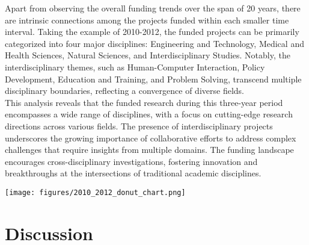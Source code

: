 \documentclass[12pt,twoside]{report}
\begin{document}
Apart from observing the overall funding trends over the span of 20 years, there are intrinsic connections among the projects funded within each smaller time interval. Taking the example of 2010-2012, the funded projects can be primarily categorized into four major disciplines: Engineering and Technology, Medical and Health Sciences, Natural Sciences, and Interdisciplinary Studies. Notably, the interdisciplinary themes, such as Human-Computer Interaction, Policy Development, Education and Training, and Problem Solving, transcend multiple disciplinary boundaries, reflecting a convergence of diverse fields.\\

This analysis reveals that the funded research during this three-year period encompasses a wide range of disciplines, with a focus on cutting-edge research directions across various fields. The presence of interdisciplinary projects underscores the growing importance of collaborative efforts to address complex challenges that require insights from multiple domains. The funding landscape encourages cross-disciplinary investigations, fostering innovation and breakthroughs at the intersections of traditional academic disciplines.\\

\begin{center}
    \texttt{[image: figures/2010\_2012\_donut\_chart.png]}
    \label{fig:donut_chart}
\end{center}



\chapter{Discussion}


 

\end{document}
